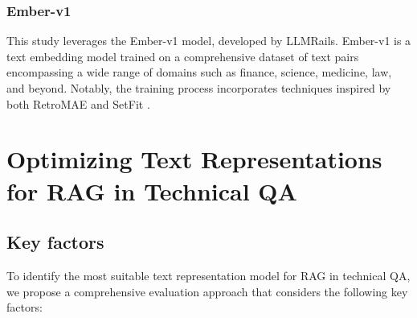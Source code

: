 \subsubsection{Ember-v1}
This study leverages the Ember-v1 model, developed by LLMRails.
Ember-v1 is a text embedding model trained on a comprehensive dataset of text pairs encompassing a wide range of domains such as finance, science, medicine, law, and beyond.
Notably, the training process incorporates techniques inspired by both \ac{RetroMAE} \cite{xiao2022retromae} and SetFit \cite{tunstall2022efficient}. 





\section{Optimizing Text Representations for \ac{RAG} in Technical \ac{QA}}

\subsection{Key factors}
To identify the most suitable text representation model for \ac{RAG} in technical \ac{QA}, we propose a comprehensive evaluation approach that considers the following key factors:

